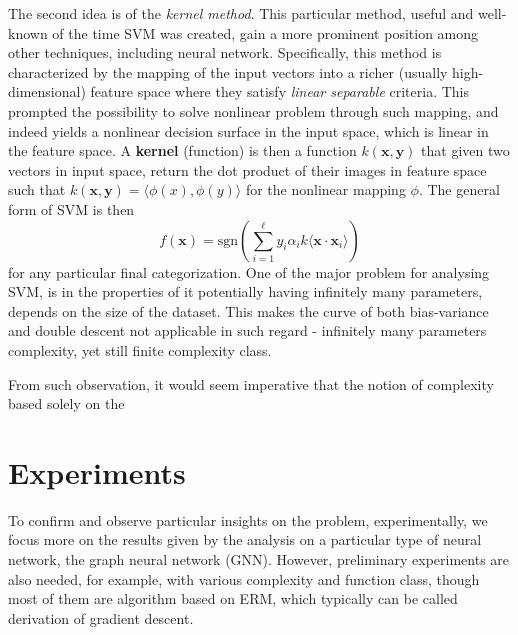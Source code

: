 The second idea is of the \textit{kernel method}. This particular method, useful and well-known of the time SVM was created, gain a more prominent position among other techniques, including neural network. Specifically, this method is characterized by the mapping of the input vectors into a richer (usually high-dimensional) feature space where they satisfy \textit{linear separable} criteria. This prompted the possibility to solve nonlinear problem through such mapping, and indeed yields a nonlinear decision surface in the input space, which is linear in the feature space. A \textbf{kernel} (function) is then a function $k(\mathbf{x},\mathbf{y})$ that given two vectors in input space, return the dot product of their images in feature space such that $k(\mathbf{x},\mathbf{y})=\langle \phi(x), \phi(y) \rangle$ for the nonlinear mapping $\phi$. The general form of SVM is then 
\begin{equation}
    f(\mathbf{x}) = \mathrm{sgn} \left(\sum^{\ell}_{i=1} y_{i}\alpha_{i}k\langle \mathbf{x}\cdot \mathbf{x}_{i} \rangle\right)
\end{equation}
for any particular final categorization. One of the major problem for analysing SVM, is in the properties of it potentially having infinitely many parameters, depends on the size of the dataset. This makes the curve of both bias-variance and double descent not applicable in such regard - infinitely many parameters complexity, yet still finite complexity class. 

From such observation, it would seem imperative that the notion of complexity based solely on the 

\clearpage

\section{Experiments}

To confirm and observe particular insights on the problem, experimentally, we focus more on the results given by the analysis on a particular type of neural network, the graph neural network (GNN). However, preliminary experiments are also needed, for example, with various complexity and function class, though most of them are algorithm based on ERM, which typically can be called derivation of gradient descent. 

